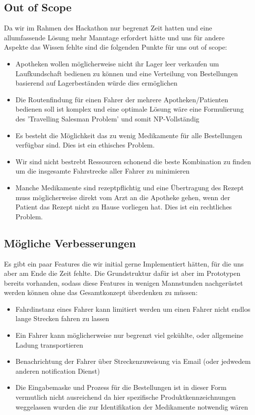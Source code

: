 \documentclass[a4]{article}
\begin{document}
\subsection{Out of Scope}

Da wir im Rahmen des Hackathon nur begrenzt Zeit hatten und eine allumfassende Lösung mehr Manntage erfordert hätte und uns für andere Aspekte das Wissen fehlte sind die folgenden Punkte für uns out of scope:

\begin{itemize}
\item Apotheken wollen möglicherweise nicht ihr Lager leer verkaufen um Laufkundschaft bedienen zu können und eine Verteilung von Bestellungen basierend auf Lagerbeständen würde dies ermöglichen
\item Die Routenfindung für einen Fahrer der mehrere Apotheken/Patienten bedienen soll ist komplex und eine optimale Lösung wäre eine Formulierung des 'Travelling Salesman Problem' und somit NP-Vollständig
\item Es besteht die Möglichkeit das zu wenig Medikamente für alle Bestellungen verfügbar sind. Dies ist ein ethisches Problem.
\item Wir sind nicht bestrebt Ressourcen schonend die beste Kombination zu finden um die insgesamte Fahrstrecke aller Fahrer zu minimieren
\item Manche Medikamente sind rezeptpflichtig und eine Übertragung des Rezept muss möglicherweise direkt vom Arzt an die Apotheke gehen, wenn der Patient das Rezept nicht zu Hause vorliegen hat. Dies ist ein rechtliches Problem.
\end{itemize}

\subsection{Mögliche Verbesserungen}

Es gibt ein paar Features die wir initial gerne Implementiert hätten, für die uns aber am Ende die Zeit fehlte. Die Grundstruktur dafür ist aber im Prototypen bereits vorhanden, sodass diese Features in wenigen
Mannstunden nachgerüstet werden können ohne das Gesamtkonzept überdenken zu müssen:

\begin{itemize}
\item Fahrdinstanz eines Fahrer kann limitiert werden um einen Fahrer nicht endlos lange Strecken fahren zu lassen
\item Ein Fahrer kann möglicherweise nur begrenzt viel gekühlte, oder allgemeine Ladung transportieren
\item Benachrichtung der Fahrer über Streckenzuweisung via Email (oder jedwedem anderen notification Dienst)
\item Die Eingabemaske und Prozess für die Bestellungen ist in dieser Form vermutlich nicht ausreichend da hier spezifische Produktkennzeichnungen weggelassen wurden die zur Identifikation der Medikamente notwendig wären
\end{itemize}
\end{document}
